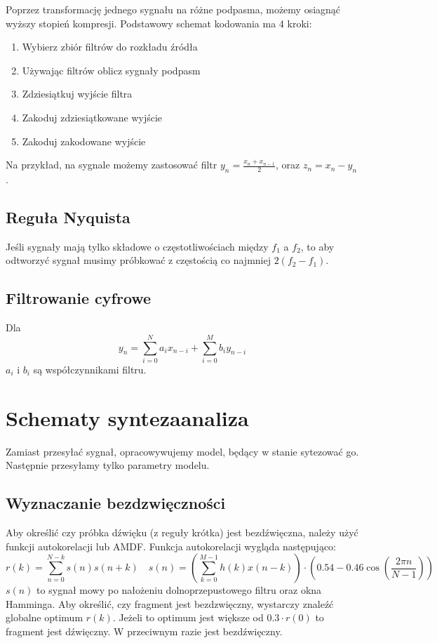 \documentclass{../notatki}
\begin{document}
Poprzez transformację jednego sygnału na różne podpasma, możemy
osiagnąć wyższy stopień kompresji. Podstawowy schemat kodowania ma 4 kroki:
\begin{enumerate}
\item Wybierz zbiór filtrów do rozkładu źródła
\item Używając filtrów oblicz sygnały podpasm
\item Zdziesiątkuj wyjście filtra
\item Zakoduj zdziesiątkowane wyjście
\item Zakoduj zakodowane wyjście
\end{enumerate}

Na przykład, na sygnale możemy zastosować filtr $y_n = \frac{x_n +
x_{n - 1}}{2}$, oraz $z_n = x_n - y_n$.

\subsection{Reguła Nyquista}

Jeśli sygnały mają tylko składowe o częstotliwościach między $f_1$ a $f_2$, to
aby odtworzyć sygnał musimy próbkować z częstością co najmniej $2(f_2 - f_1)$.

\subsection{Filtrowanie cyfrowe}

Dla
$$
y_n =\sum_{i=0}^{N} a_i x_{n-i} + \sum_{i=0}^{M} b_i y_{n-i}
$$
$a_i$ i $b_i$ są współczynnikami filtru.

\section{Schematy synteza\-analiza}

Zamiast przesyłać sygnał, opracowywujemy model, będący w stanie sytezować go.
Następnie przesyłamy tylko parametry modelu.

\subsection{Wyznaczanie bezdzwięczności}

Aby określić czy próbka dźwięku (z reguły krótka) jest bezdźwięczna, należy
użyć funkcji autokorelacji lub AMDF. Funkcja autokorelacji wygląda
następująco:
$$
r(k) = \sum_{n=0}^{N-k} s(n)s(n + k) \quad s(n) = (\sum_{k=0}^{M -
1}h(k)x(n - k)) \cdot (0.54 - 0.46 \cos(\frac{2\pi n}{N - 1}))
$$
$s(n)$ to sygnał mowy po nałożeniu dolnoprzepustowego filtru oraz okna Hamminga.
Aby określić, czy fragment jest bezdzwięczny, wystarczy znaleźć globalne optimum
$r(k)$. Jeżeli to optimum jest większe od $0.3 \cdot r(0)$ to fragment jest
dźwięczny. W przeciwnym razie jest bezdźwięczny.
\end{document}
